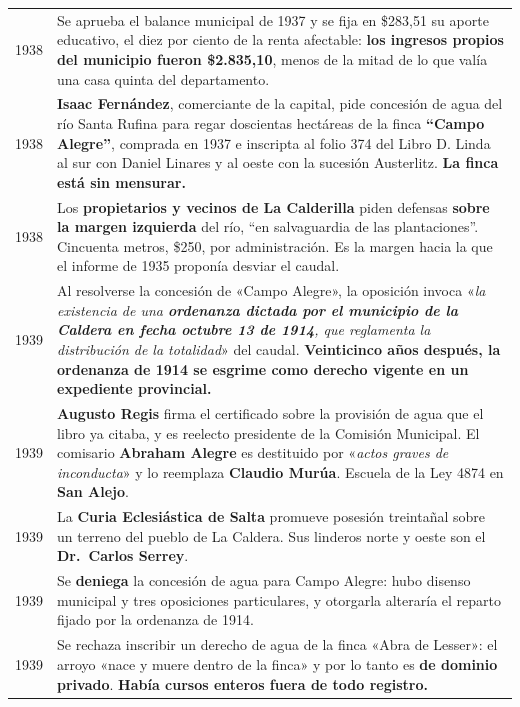 \begin{longtable}{@{}p{2.7cm}p{10.3cm}@{}}
1938 & Se aprueba el balance municipal de 1937 y se fija en \$283,51 su aporte educativo, el diez por ciento de la renta afectable: \textbf{los ingresos propios del municipio fueron \$2.835,10}, menos de la mitad de lo que valía una casa quinta del departamento. \\
1938 & \textbf{Isaac Fernández}, comerciante de la capital, pide concesión de agua del río Santa Rufina para regar doscientas hectáreas de la finca \textbf{``Campo Alegre''}, comprada en 1937 e inscripta al folio 374 del Libro D. Linda al sur con Daniel Linares\index{Linares, Daniel} y al oeste con la sucesión Austerlitz\index{Austerlitz, Bernardo}. \textbf{La finca está sin mensurar.} \\
1938 & Los \textbf{propietarios y vecinos de La Calderilla} piden defensas \textbf{sobre la margen izquierda} del río, ``en salvaguardia de las plantaciones''. Cincuenta metros, \$250, por administración. Es la margen hacia la que el informe de 1935 proponía desviar el caudal. \\
1939 & Al resolverse la concesión de «Campo Alegre», la oposición invoca «\textit{la existencia de una \textbf{ordenanza dictada por el municipio de la Caldera en fecha octubre 13 de 1914}, que reglamenta la distribución de la totalidad}» del caudal. \textbf{Veinticinco años después, la ordenanza de 1914 se esgrime como derecho vigente en un expediente provincial.} \\
1939 & \textbf{Augusto Regis}\index{Regis, Augusto} firma el certificado sobre la provisión de agua que el libro ya citaba, y es reelecto presidente de la Comisión Municipal. El comisario \textbf{Abraham Alegre} es destituido por «\textit{actos graves de inconducta}» y lo reemplaza \textbf{Claudio Murúa}\index{Murúa, Carlos}. Escuela de la Ley 4874 en \textbf{San Alejo}. \\
1939 & La \textbf{Curia Eclesiástica de Salta} promueve posesión treintañal sobre un terreno del pueblo de La Caldera. Sus linderos norte y oeste son el \textbf{Dr.\ Carlos Serrey\index{Serrey, Carlos}}. \\
1939 & Se \textbf{deniega} la concesión de agua para Campo Alegre: hubo disenso municipal y tres oposiciones particulares, y otorgarla alteraría el reparto fijado por la ordenanza de 1914. \\
1939 & Se rechaza inscribir un derecho de agua de la finca «Abra de Lesser»: el arroyo «nace y muere dentro de la finca» y por lo tanto es \textbf{de dominio privado}. \textbf{Había cursos enteros fuera de todo registro.} \\

\end{longtable}
